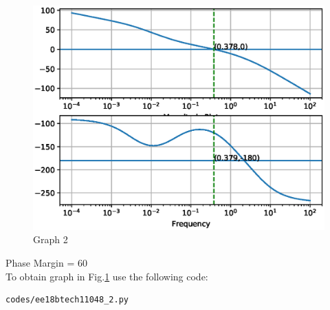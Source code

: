 \begin{enumerate}[label=\thesection.\arabic*.,ref=\thesection.\theenumi]
\begin{figure}[!h]
\centering
  \includegraphics[width=\columnwidth]{./figs/ee18btech11048_2.eps}
  \caption{Graph 2}
  \label{fig: Graph 2}
\end{figure}
Phase Margin = 60\degree\\
To obtain graph in Fig.\ref{fig: Graph 2} use the following code:
\begin{lstlisting}
codes/ee18btech11048_2.py
\end{lstlisting}
\end{enumerate}     
